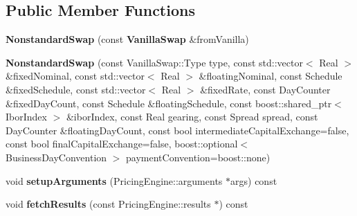 \subsection*{Public Member Functions}
\begin{DoxyCompactItemize}
\item 
{\bfseries Nonstandard\+Swap} (const {\bf Vanilla\+Swap} \&from\+Vanilla)\label{class_quant_lib_1_1_nonstandard_swap_aa2cc63d4d7367bf89306bf9e4fa5df64}

\item 
{\bfseries Nonstandard\+Swap} (const Vanilla\+Swap\+::\+Type type, const std\+::vector$<$ Real $>$ \&fixed\+Nominal, const std\+::vector$<$ Real $>$ \&floating\+Nominal, const Schedule \&fixed\+Schedule, const std\+::vector$<$ Real $>$ \&fixed\+Rate, const Day\+Counter \&fixed\+Day\+Count, const Schedule \&floating\+Schedule, const boost\+::shared\+\_\+ptr$<$ Ibor\+Index $>$ \&ibor\+Index, const Real gearing, const Spread spread, const Day\+Counter \&floating\+Day\+Count, const bool intermediate\+Capital\+Exchange=false, const bool final\+Capital\+Exchange=false, boost\+::optional$<$ Business\+Day\+Convention $>$ payment\+Convention=boost\+::none)\label{class_quant_lib_1_1_nonstandard_swap_aae56ebf40879463798fc8d141a2e7a55}

\item 
void {\bfseries setup\+Arguments} (Pricing\+Engine\+::arguments $\ast$args) const \label{class_quant_lib_1_1_nonstandard_swap_a61b1169ee3c5fe7141828b9753d7040a}

\item 
void {\bfseries fetch\+Results} (const Pricing\+Engine\+::results $\ast$) const \label{class_quant_lib_1_1_nonstandard_swap_a4d48f886a70fcc19ec4e88d5622024c4}

\end{DoxyCompactItemize}
